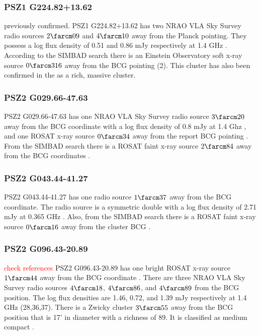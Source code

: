 \documentclass[apj, revtex4-1]{emulateapj}
\newcommand{\editorial}[1]{\textcolor{red}{#1}}
\begin{document}
\subsubsection{PSZ1 G224.82+13.62}
previously confirmed. PSZ1 G224.82+13.62 has two NRAO VLA Sky Survey radio sources $2\farcm09$ and $4\farcm10$ away from the Planck pointing. They possess a log flux density of 0.51 and 0.86 mJy respectively at 1.4 GHz \citep{Condon1998}. According to the SIMBAD search there is an Einstein Observatory soft x-ray source $0\farcm316$ away from the BCG pointing (2). This cluster has also been confirmed in the \citep{Barrena2018} as a rich, massive cluster.

\subsubsection{PSZ2 G029.66-47.63}
PSZ2 G029.66-47.63 has one NRAO VLA Sky Survey radio source $3\farcm20$ away from the BCG coordinate with a log flux density of 0.8 mJy at 1.4 Ghz \citep{Condon1998}, and one ROSAT x-ray source $0\farcm34$ away from the report BCG pointing \citep{Voges2000}. From the SIMBAD search there is a ROSAT faint x-ray source $2\farcm84$ away from the BCG coordinates \citep{Bohringer2000}.


\subsubsection{PSZ2 G043.44-41.27}
PSZ2 G043.44-41.27 has one radio source $1\farcm37$ away from the BCG coordinate. The radio source is a symmetric double with a log flux density of 2.71 mJy at 0.365 GHz \citep{Condon1998}. Also, from the SIMBAD search there is a ROSAT faint x-ray source $0\farcm16$ away from the cluster BCG \citep{Bohringer2000}.

\subsubsection{PSZ2 G096.43-20.89}
\editorial{check references}
PSZ2 G096.43-20.89 has one bright ROSAT x-ray source $1\farcm44$ away from the BCG coordinate \citep{Voges1999a}. There are three NRAO VLA Sky Survey radio sources $4\farcm18$, $4\farcm86$, and $4\farcm89$ from the BCG position. The log flux densities are 1.46, 0.72, and 1.39 mJy respectively at 1.4 GHz (28,36,37). There is a Zwicky cluster $3\farcm55$ away from the BCG position that is 17' in diameter with a richness of 89. It is classified as medium compact \citep{Zwicky1968}.
\end{document}
